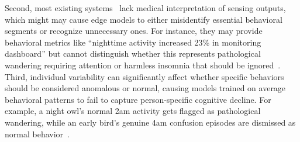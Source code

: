 \documentclass[sigconf, anonymous, 9pt, nonacm]{acmart}
\begin{document}
Second, most existing systems~\cite{Civitarese2025SERENADE} lack medical interpretation of sensing outputs, which might may cause edge models to either misidentify essential behavioral segments or recognize unnecessary ones.
For instance, they may provide behavioral metrics like ``nighttime activity increased 23\% in monitoring dashboard'' but cannot distinguish whether this represents pathological wandering requiring attention or harmless insomnia that should be ignored~\cite{kamil2021detection}. 
Third, individual variability can significantly affect whether specific behaviors should be considered anomalous or normal, causing models trained on average behavioral patterns to fail to capture person-specific cognitive decline. 
For example, a night owl's normal 2am activity gets flagged as pathological wandering, while an early bird's genuine 4am confusion episodes are dismissed as normal behavior~\cite{populationdigitalhealth, peterson2017personalized}. 

\end{document}
